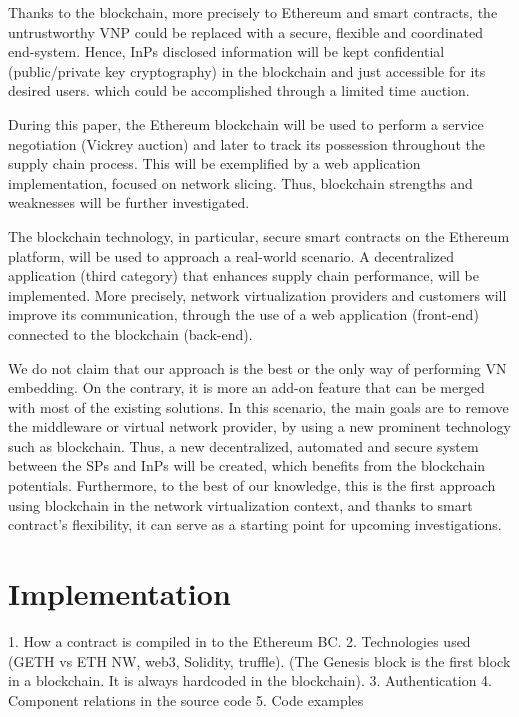Thanks to the blockchain, more precisely to Ethereum and smart contracts, the untrustworthy VNP could be replaced with a secure, flexible and coordinated end-system. Hence, InPs disclosed information will be kept confidential (public/private key cryptography) in the blockchain and just accessible for its desired users. which could be accomplished through a limited time auction.

During this paper, the Ethereum blockchain will be used to perform a service negotiation (Vickrey auction) and later to track its possession throughout the supply chain process. This will be exemplified by a web application implementation, focused on network slicing. Thus, blockchain strengths and weaknesses will be further investigated.

The blockchain technology, in particular, secure smart contracts on the Ethereum platform, will be used to approach a real-world scenario. A decentralized application (third category) that enhances supply chain performance, will be implemented. More precisely, network virtualization providers and customers will improve its communication, through the use of a web application (front-end) connected to the blockchain (back-end).

We do not claim that our approach is the best or the only way
of performing VN embedding. On the contrary, it is more an add-on feature that can be merged with most of the existing solutions. In this scenario, the main goals are to remove the middleware or virtual network provider, by using a new prominent technology such as blockchain. Thus, a new decentralized, automated and secure system between the SPs and InPs will be created, which benefits from the blockchain potentials. Furthermore, to the best of our knowledge, this is the first approach using blockchain in the network virtualization context, and thanks to smart contract's flexibility, it can serve as a starting point for upcoming investigations.


\chapter{Implementation}

1. How a contract is compiled in to the Ethereum BC.
2. Technologies used (GETH vs ETH NW, web3, Solidity, truffle).
(The Genesis block is the first block in a blockchain. It is always hardcoded in the blockchain).
3. Authentication 
4. Component relations in the source code
5. Code examples

